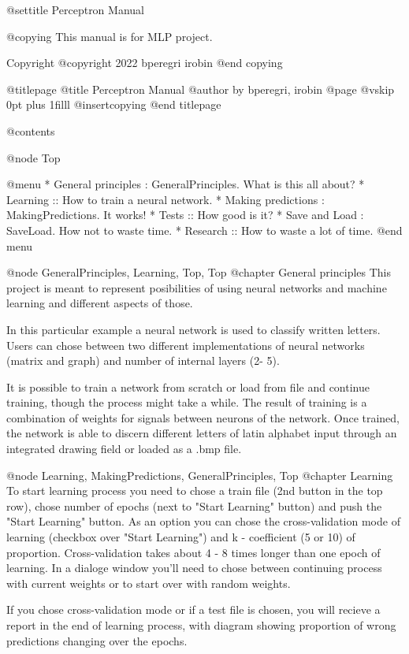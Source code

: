 
@settitle Perceptron Manual

@copying
This manual is for MLP project.

Copyright @copyright{} 2022 bperegri irobin
@end copying

@titlepage
@title Perceptron Manual
@author by bperegri, irobin
@page
@vskip 0pt plus 1filll
@insertcopying
@end titlepage

@contents

@node Top

@menu
* General principles : GeneralPrinciples. What is this all about?
* Learning ::                             How to train a neural network.
* Making predictions : MakingPredictions. It works!
* Tests ::                                How good is it?
* Save and Load : SaveLoad.               How not to waste time.
* Research ::                             How to waste a lot of time.
@end menu

@node GeneralPrinciples, Learning, Top, Top
@chapter General principles
  This project is meant to represent posibilities of using neural networks and machine learning and different aspects of those.

  In this particular example a neural network is used to classify written letters. Users can chose between two different implementations of neural networks (matrix and graph) and number of internal layers (2- 5).

  It is possible to train a network from scratch or load from file and continue training, though the process might take a while. The result of training is a combination of weights for signals between neurons of the network. Once trained, the network is able to discern different letters of latin alphabet input through an integrated drawing field or loaded as a .bmp file.

@node Learning, MakingPredictions, GeneralPrinciples, Top
@chapter Learning
  To start learning process you need to chose a train file (2nd button in the top row), chose number of epochs (next to "Start Learning" button) and push the "Start Learning" button. As an option you can chose the cross-validation mode of learning (checkbox over "Start Learning") and k - coefficient (5 or 10) of proportion. Cross-validation takes about 4 - 8 times longer than one epoch of learning. In a dialoge window you'll need to chose between continuing process with current weights or to start over with random weights.

  If you chose cross-validation mode or if a test file is chosen, you will recieve a report in the end of learning process, with diagram showing proportion of wrong predictions changing over the epochs.

